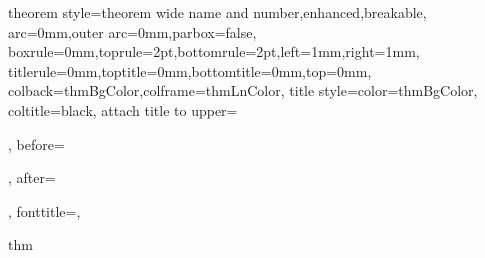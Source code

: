 \newcommand{\highlight}[1]{\textbf{\textsf{\textcolor{myColorMainA}{#1}}}}
\newcommand{\symbdefbox}[2]{\highlight{#1 #2}\mathmarginbox{#2}}
\newcommand{\mathmarginbox}[1]{\myMarginnote{\scalebox{1.5}{\ifthispageodd{$\blacktriangleleft$}{\null} #1 \ifthispageodd{\null}{$\blacktriangleright$}}}}
\newcommand{\example}[1]{\small\examplebox{\textit{Example:} #1}}

\newcommand{\mscal}[1]{\langle#1\rangle}
\newcommand{\mvec}[1]{\mathbf{#1}}

\usepackage{amsmath,amsthm,amsfonts}
\usepackage{lipsum}

\usepackage{tcolorbox}
\usepackage{changepage}%


\makeatletter
\def\tcb@theo@widetitle#1#2#3{\hbox to \textwidth{\textsc{\large#1}\normalsize\space#3\hfil(#2)}}
\makeatother

%
{theorem style=theorem wide name and number,enhanced,breakable,
	arc=0mm,outer arc=0mm,parbox=false,
	boxrule=0mm,toprule=2pt,bottomrule=2pt,left=1mm,right=1mm,
	titlerule=0mm,toptitle=0mm,bottomtitle=0mm,top=0mm,
	colback=thmBgColor,colframe=thmLnColor,
	title style={color=thmBgColor}, coltitle=black,
	attach title to upper={\par\noindent},
	before={\par\vfill\smallbreak\noindent}, after={\par},
	fonttitle=\normalfont\large,
}{thm}

\newenvironment{theorem}[2][]{\noindent\mytheorem{#1}{#2}}{\endmytheorem}

\let\realproof\proof
\let\realendproof\endproof
\renewenvironment{proof}[1][Proof]{\ProofBox\strut\textsc{#1}\space}{\endProofBox}

